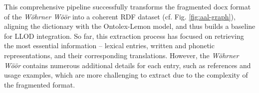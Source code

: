 This comprehensive pipeline successfully transforms the fragmented docx format of the \emph{Wöhrner Wöör} into a coherent RDF dataset (cf. Fig. \ref{fig:aal-graph}), aligning the dictionary with the Ontolex-Lemon model, and thus builds a baseline for LLOD integration. So far, this extraction process has focused on retrieving the most essential information -- lexical entries, written and phonetic representations, and their corresponding translations. However, the \emph{Wöhrner Wöör} contains numerous additional details for each entry, such as references and usage examples, which are more challenging to extract due to the complexity of the fragmented format.





%
%
%

